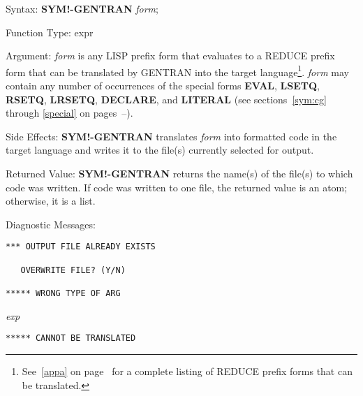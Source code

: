 \begin{describe}{Syntax:}
{\bf SYM!-GENTRAN} {\it form\/};
\end{describe}
\begin{describe}{Function Type:}
expr
\end{describe} 
\begin{describe}{Argument:}
{\it form\/} is any LISP prefix form that evaluates to a
REDUCE prefix form that can be translated by GENTRAN into the target 
language\footnote{
See~\ref{appa} on page~\pageref{appa} for a complete listing of REDUCE
prefix forms that can be translated.}.
{\it form\/} may contain any number of occurrences of the special forms 
   
 
{\bf EVAL}, {\bf LSETQ}, {\bf RSETQ}, {\bf LRSETQ}, {\bf DECLARE}, and 
{\bf LITERAL} (see sections~\ref{sym:cg} through \ref{special} on
pages~\pageref{sym:cg}--\pageref{special}).
\end{describe}
\begin{describe}{Side Effects:}
{\bf SYM!-GENTRAN} translates {\it form\/} into formatted code in the target
language and writes it to the file(s) currently selected for output.
\end{describe}
\begin{describe}{Returned Value:}
{\bf SYM!-GENTRAN} returns the name(s) of the file(s) to which code
was written.  If code was written to one file, the returned value is an atom;
otherwise, it is a list.
\end{describe} 
\begin{describe}{Diagnostic Messages:}
\begin{verbatim}
*** OUTPUT FILE ALREADY EXISTS

   OVERWRITE FILE? (Y/N)

***** WRONG TYPE OF ARG
\end{verbatim}
{\it exp}
\begin{verbatim}
***** CANNOT BE TRANSLATED
\end{verbatim}
\end{describe} 
